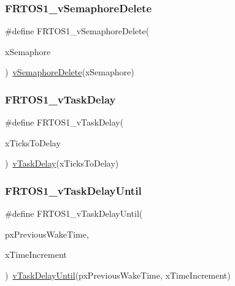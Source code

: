 \subsubsection{\texorpdfstring{F\+R\+T\+O\+S1\+\_\+v\+Semaphore\+Delete}{FRTOS1\_vSemaphoreDelete}}
{\footnotesize\ttfamily \#define F\+R\+T\+O\+S1\+\_\+v\+Semaphore\+Delete(\begin{DoxyParamCaption}\item[{}]{x\+Semaphore }\end{DoxyParamCaption})~\hyperlink{semphr_8h_acd7d0eda0923d7caeeaaee9202c43eab}{v\+Semaphore\+Delete}(x\+Semaphore)}

\mbox{\label{group___f_r_t_o_s1__module_ga31e207c0eb1a496de7069e8ba6573287}} 
\subsubsection{\texorpdfstring{F\+R\+T\+O\+S1\+\_\+v\+Task\+Delay}{FRTOS1\_vTaskDelay}}
{\footnotesize\ttfamily \#define F\+R\+T\+O\+S1\+\_\+v\+Task\+Delay(\begin{DoxyParamCaption}\item[{}]{x\+Ticks\+To\+Delay }\end{DoxyParamCaption})~\hyperlink{tasks_8c_a9917b05abb77e75e959151ae67065dce}{v\+Task\+Delay}(x\+Ticks\+To\+Delay)}

\mbox{\label{group___f_r_t_o_s1__module_gaac0258bd4992309055d82679f3ed2c71}} 
\subsubsection{\texorpdfstring{F\+R\+T\+O\+S1\+\_\+v\+Task\+Delay\+Until}{FRTOS1\_vTaskDelayUntil}}
{\footnotesize\ttfamily \#define F\+R\+T\+O\+S1\+\_\+v\+Task\+Delay\+Until(\begin{DoxyParamCaption}\item[{}]{px\+Previous\+Wake\+Time,  }\item[{}]{x\+Time\+Increment }\end{DoxyParamCaption})~\hyperlink{tasks_8c_abbc32467f223c78ba36f577b56a32897}{v\+Task\+Delay\+Until}(px\+Previous\+Wake\+Time, x\+Time\+Increment)}

